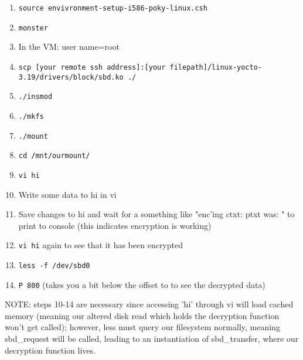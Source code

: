 \documentclass[titlepage,draftclsnofoot,onecolumn]{article}
\begin{document}
\begin{enumerate}
	\item \texttt{source envivronment-setup-i586-poky-linux.csh}
	\item \texttt{monster}
	\item In the VM: user name=root
	\item \texttt{scp [your remote ssh address]:[your filepath]/linux-yocto-3.19/drivers/block/sbd.ko ./}
	\item \texttt{./insmod}
	\item \texttt{./mkfs}
	\item \texttt{./mount}
	\item \texttt{cd /mnt/ourmount/}
	\item \texttt{vi hi}
	\item Write some data to hi in vi
	\item Save changes to hi and wait for a something like "enc'ing ctxt: ptxt was: " to print to console (this indicates encryption is working)
	\item \texttt{vi hi} again to see that it has been encrypted
	\item \texttt{less -f /dev/sbd0}
	\item \texttt{P 800} (takes you a bit below the offset to to see the decrypted data)
  \end{enumerate}
  
  NOTE: steps 10-14 are necessary since accessing 'hi' through vi will load cached memory (meaning our altered disk read which holds the decryption function won't get called); however, less must query our filesystem normally, meaning sbd\_request will be called, leading to an instantiation of sbd\_transfer, where our decryption function lives.
\end{document}
